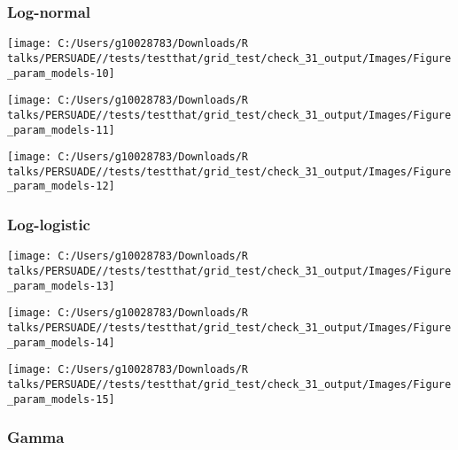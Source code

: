 \documentclass[
]{article}
\begin{document}
\clearpage

\subsubsection{Log-normal}\label{log-normal}

\begin{flushleft}\texttt{[image: C:/Users/g10028783/Downloads/R talks/PERSUADE//tests/testthat/grid\_test/check\_31\_output/Images/Figure\_param\_models-10]} \end{flushleft}

\begin{flushleft}\texttt{[image: C:/Users/g10028783/Downloads/R talks/PERSUADE//tests/testthat/grid\_test/check\_31\_output/Images/Figure\_param\_models-11]} \end{flushleft}

\begin{flushleft}\texttt{[image: C:/Users/g10028783/Downloads/R talks/PERSUADE//tests/testthat/grid\_test/check\_31\_output/Images/Figure\_param\_models-12]} \end{flushleft}

\clearpage

\subsubsection{Log-logistic}\label{log-logistic}

\begin{flushleft}\texttt{[image: C:/Users/g10028783/Downloads/R talks/PERSUADE//tests/testthat/grid\_test/check\_31\_output/Images/Figure\_param\_models-13]} \end{flushleft}

\begin{flushleft}\texttt{[image: C:/Users/g10028783/Downloads/R talks/PERSUADE//tests/testthat/grid\_test/check\_31\_output/Images/Figure\_param\_models-14]} \end{flushleft}

\begin{flushleft}\texttt{[image: C:/Users/g10028783/Downloads/R talks/PERSUADE//tests/testthat/grid\_test/check\_31\_output/Images/Figure\_param\_models-15]} \end{flushleft}

\clearpage

\subsubsection{Gamma}\label{gamma}
\end{document}
